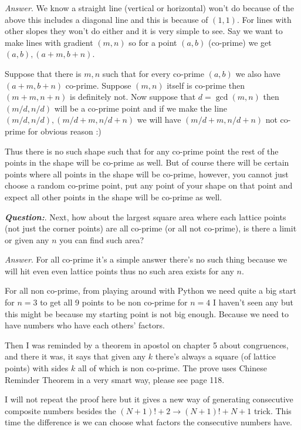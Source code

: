 \documentclass[aps,preprint,preprintnumbers,nofootinbib,showpacs,prd]{revtex4-1}
\begin{document}
\begin{enumerate}
{\it Answer}. We know a straight line (vertical or horizontal) won't do because of the above this includes a diagonal line and this is because of $(1,1)$.  For lines with other slopes they won't do either and it is very simple to see. Say we want to make lines with gradient $(m,n)$ so for a point $(a,b)$ (co-prime) we get $(a,b),(a+m, b+n)$. 

Suppose that there is $m,n$ such that for every co-prime $(a,b)$ we also have $(a+m,b+n)$ co-prime. Suppose $(m,n)$ itself is co-prime then $(m+m,n+n)$ is definitely not. Now suppose that $d = \gcd(m,n)$ then $(m/d, n/d)$ will be a co-prime point and if we make the line $(m/d, n/d), (m/d + m, n/d + n)$ we will have $(m/d + m, n/d + n)$ not co-prime for obvious reason :)

Thus there is no such shape such that for any co-prime point the rest of the points in the shape will be co-prime as well. But of course there will be certain points where all points in the shape will be co-prime, however, you cannot just choose a random co-prime point, put any point of your shape on that point and expect all other points in the shape will be co-prime as well.

\textbf{\textit{Question:}}. Next, how about the largest square area where each lattice points (not just the corner points) are all co-prime (or all not co-prime), is there a limit or given any $n$ you can find such area?

{\it Answer}. For all co-prime it's a simple answer there's no such thing because we will hit even even lattice points thus no such area exists for any $n$.

For all non co-prime, from playing around with Python we need quite a big start for $n = 3$ to get all 9 points to be non co-prime for $n = 4$ I haven't seen any but this might be because my starting point is not big enough. Because we need to have numbers who have each others' factors.

Then I was reminded by a theorem in apostol on chapter 5 about congruences, and there it was, it says that given any $k$ there's always a square (of lattice points) with sides $k$ all of which is non co-prime. The prove uses Chinese Reminder Theorem in a very smart way, please see page 118.

I will not repeat the proof here but it gives a new way of generating consecutive composite numbers besides the $(N + 1)! + 2 \to (N + 1)! + N + 1$ trick. This time the difference is we can choose what factors the consecutive numbers have.


\end{enumerate}
\end{document}

